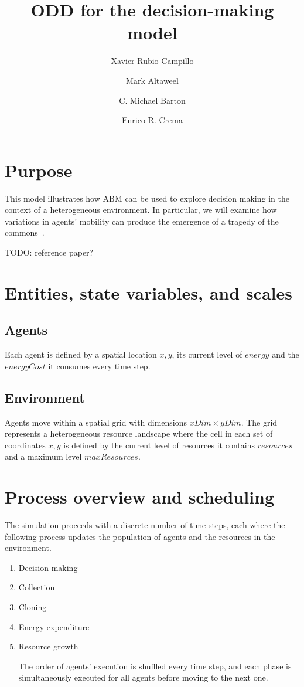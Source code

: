 \documentclass[11pt,a4paper,twocolumn,notitlepage]{article}
\begin{document}
\title{ODD for the decision-making model}
\author{Xavier Rubio-Campillo \and Mark Altaweel \and C. Michael Barton \and Enrico R. Crema}
\maketitle

\section{Purpose}

This model illustrates how ABM can be used to explore decision making in the context of a heterogeneous environment. In particular, we will examine how variations in agents' mobility can produce the emergence of a tragedy of the commons~\citep{hardin1968tragedy}.

TODO: reference paper?

\section{Entities, state variables, and scales}
\subsection{Agents}

Each agent is defined by a spatial location $x,y$, its current level of $energy$ and the $energyCost$ it consumes every time step.

\subsection{Environment}

Agents move within a spatial grid with dimensions $xDim \times yDim$. The grid represents a heterogeneous resource landscape where the cell in each set of coordinates $x,y$ is defined by the current level of resources it contains $resources$ and a maximum level $maxResources$. 

\section{Process overview and scheduling}

The simulation proceeds with a discrete number of time-steps, each where the following process updates the population of agents and the resources in the environment.

\begin{enumerate}
\item{Decision making}
\item{Collection}
\item{Cloning}
\item{Energy expenditure}
\item{Resource growth}

The order of agents' execution is shuffled every time step, and each phase is simultaneously executed for all agents before moving to the next one.

\end{enumerate}
\end{document}
